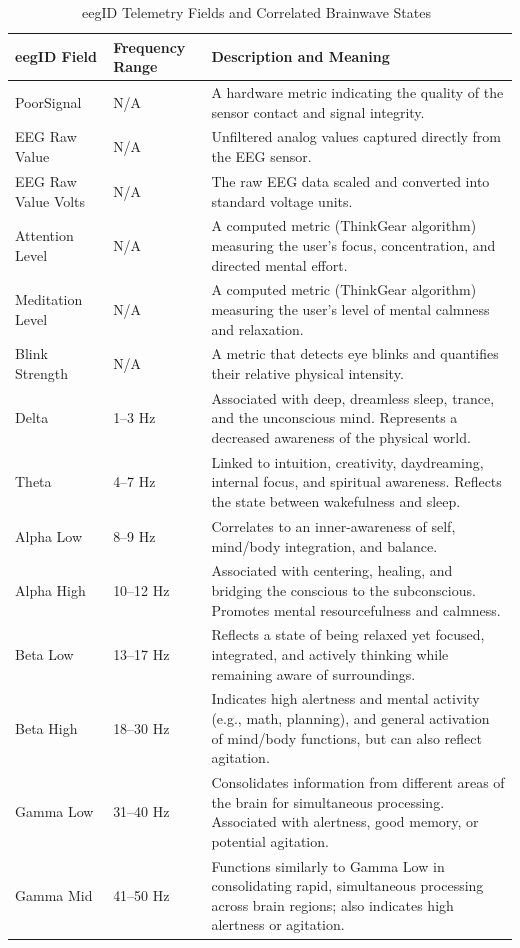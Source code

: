 \documentclass[journal]{IEEEtran}
\begin{document}
\begin{table}[t]
    \centering
    \renewcommand{\arraystretch}{1.4}
    \begin{tabularx}{\textwidth}{@{}llX@{}}
        \toprule
        \textbf{eegID Field} & \textbf{Frequency Range} & \textbf{Description and Meaning} \\
        \midrule
        PoorSignal & N/A & A hardware metric indicating the quality of the sensor contact and signal integrity. \\
        EEG Raw Value & N/A & Unfiltered analog values captured directly from the EEG sensor. \\
        EEG Raw Value Volts & N/A & The raw EEG data scaled and converted into standard voltage units. \\
        Attention Level & N/A & A computed metric (ThinkGear algorithm) measuring the user's focus, concentration, and directed mental effort. \\
        Meditation Level & N/A & A computed metric (ThinkGear algorithm) measuring the user's level of mental calmness and relaxation. \\
        Blink Strength & N/A & A metric that detects eye blinks and quantifies their relative physical intensity. \\
        Delta & 1--3 Hz & Associated with deep, dreamless sleep, trance, and the unconscious mind. Represents a decreased awareness of the physical world. \\
        Theta & 4--7 Hz & Linked to intuition, creativity, daydreaming, internal focus, and spiritual awareness. Reflects the state between wakefulness and sleep. \\
        Alpha Low & 8--9 Hz & Correlates to an inner-awareness of self, mind/body integration, and balance. \\
        Alpha High & 10--12 Hz & Associated with centering, healing, and bridging the conscious to the subconscious. Promotes mental resourcefulness and calmness. \\
        Beta Low & 13--17 Hz & Reflects a state of being relaxed yet focused, integrated, and actively thinking while remaining aware of surroundings. \\
        Beta High & 18--30 Hz & Indicates high alertness and mental activity (e.g., math, planning), and general activation of mind/body functions, but can also reflect agitation. \\
        Gamma Low & 31--40 Hz & Consolidates information from different areas of the brain for simultaneous processing. Associated with alertness, good memory, or potential agitation. \\
        Gamma Mid & 41--50 Hz & Functions similarly to Gamma Low in consolidating rapid, simultaneous processing across brain regions; also indicates high alertness or agitation. \\
        \bottomrule
    \end{tabularx}
    \vspace{5pt}
    \caption{eegID Telemetry Fields and Correlated Brainwave States~\cite{neurosky2026eegid,neurohealth_2019}}
    \label{tab:eegid_brainwaves}
\end{table}



\end{document}

